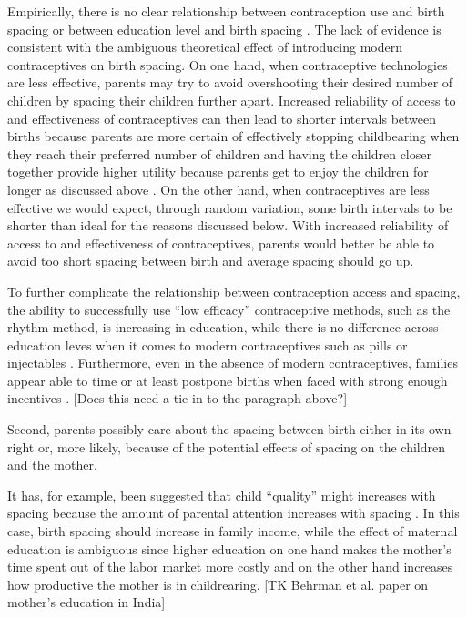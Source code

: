 Empirically, there is no clear relationship between contraception use and birth 
spacing or between education level and birth spacing
\citep{Tulasidhar1993,Whitworth2002,Bhalotra2008,Yeakey2009,Kim2010,Soest2018}.
The lack of evidence is consistent with the ambiguous theoretical effect of introducing 
modern contraceptives on birth spacing.
On one hand, when contraceptive technologies are less effective, 
parents may try to avoid overshooting their desired number of children by spacing their 
children further apart.
Increased reliability of access to and effectiveness of contraceptives can then lead to 
shorter intervals between births because parents are more certain of effectively
stopping childbearing when they reach their preferred number of children and having
the children closer together provide higher utility because parents get to enjoy the
children for longer as discussed above \citep{Keyfitz1971,Heckman1976}.
On the other hand, when contraceptives are less effective we would expect, through 
random variation, some birth intervals to be shorter than ideal for the reasons 
discussed below.
With increased reliability of access to and effectiveness of contraceptives, parents 
would better be able to avoid too short spacing between birth and average spacing
should go up.

To further complicate the relationship between contraception access and spacing,
the ability to successfully use ``low efficacy'' contraceptive methods, such as 
the rhythm method, is increasing in education, while there is no difference across education 
leves when it comes to modern contraceptives such as pills or injectables 
\citep{Rosenzweig1989}.
Furthermore, even in the absence of modern contraceptives, families appear able to time or 
at least postpone births when faced with strong enough incentives 
\citep{Jayachandran2011,Alam2018}.
[Does this need a tie-in to the paragraph above?]


Second, parents possibly care about the spacing between birth either in its own right or, 
more likely, because of the potential effects of spacing on the children and the mother.

It has, for example, been suggested that child ``quality'' might increases with spacing 
because the amount of parental attention increases with spacing
\citep{Zajonc1975,Zajonc1976,Razin1980}.
In this case, birth spacing should increase in family income, while the effect of maternal 
education is ambiguous since higher education on one hand makes the mother's time spent 
out of the labor market more costly and on the other hand increases how productive the 
mother is in childrearing. [TK Behrman et al. paper on mother's education in India]


